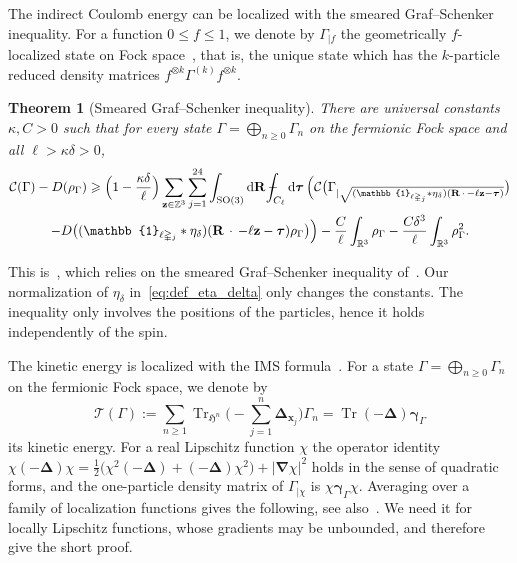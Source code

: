 \documentclass[final,reqno]{amsart}
\newtheorem{theorem}{Theorem}[section]
\theoremstyle{remark}
\renewcommand{\le}{\leqslant}
\renewcommand{\ge}{\geqslant}
\DeclareMathOperator{\Tr}{Tr}
\newcommand{\RR}{\mathbb{R}}
\newcommand{\ZZ}{\mathbb{Z}}
\newcommand{\SO}{\mathrm{SO}}
\newcommand{\iden}{\mathbb{1}}
\newcommand{\lapl}{\bm{\Delta}}
\newcommand{\grad}{\bm{\nabla}}
\newcommand{\tetra}{\mathbb{\Delta}}
\newcommand{\dd}{\mathrm{d}}
\newcommand{\TC}{\mathcal{T}}
\newcommand{\Cc}{\mathcal{C}}
\newcommand{\HF}{\mathfrak{H}}
\def\Xint#1{\mathchoice
{\XXint\displaystyle\textstyle{#1}}
{\XXint\textstyle\scriptstyle{#1}}
{\XXint\scriptstyle\scriptscriptstyle{#1}}
{\XXint\scriptscriptstyle\scriptscriptstyle{#1}}
\!\int}
\def\XXint#1#2#3{{\setbox0=\hbox{$#1{#2#3}{\int}$ }
\vcenter{\hbox{$#2#3$ }}\kern-.6\wd0}}
\def\dashint{\Xint-}
\begin{document}
The indirect Coulomb energy can be localized with the smeared Graf--Schenker inequality. For a function $0\le f\le1$, we denote by $\Gamma_{|f}$ the geometrically $f$-localized state on Fock space~\cite{lewin2011geometric}, that is, the unique state which has the $k$-particle reduced density matrices $f^{\otimes k}\Gamma^{(k)}f^{\otimes k}$.

\begin{theorem}[Smeared Graf--Schenker inequality]\label{thm:GS}
There are universal constants $\kappa,C>0$ such that for every state $\Gamma=\bigoplus_{n\ge0}\Gamma_n$ on the fermionic Fock space and all $\ell>\kappa\delta>0$,
\begin{multline*}
\Cc(\Gamma)-D(\rho_\Gamma)\ge\Big(1-\frac{\kappa\delta}{\ell}\Big)\sum_{\mathbf{z}\in\ZZ^3}\sum_{j=1}^{24}\int_{\SO(3)}\dd\mathbf{R}\,\dashint_{C_\ell}\dd\bm{\tau}\,\Big(\Cc\big(\Gamma_{|\sqrt{(\iden_{\ell\tetra_j}\ast\eta_\delta)(\mathbf{R}\,\cdot\,-\ell \mathbf{z}-\bm{\tau})}}\big)\\
-D\big((\iden_{\ell\tetra_j}\ast\eta_\delta)(\mathbf{R}\,\cdot\,-\ell \mathbf{z}-\bm{\tau})\rho_\Gamma\big)\Big)-\frac{C}{\ell}\int_{\RR^3}\rho_\Gamma-\frac{C\delta^3}{\ell}\int_{\RR^3}\rho_\Gamma^2.
\end{multline*}
\end{theorem}

This is~\cite[Eq.~(53)]{lewin2020local}, which relies on the smeared Graf--Schenker inequality of~\cite[Lemma~6]{graf1995molecular}. Our normalization of $\eta_\delta$ in~\cref{eq:def_eta_delta} only changes the constants. The inequality only involves the positions of the particles, hence it holds independently of the spin.

The kinetic energy is localized with the IMS formula~\cite{cycon2009schrodinger}. For a state $\Gamma=\bigoplus_{n\ge0}\Gamma_n$ on the fermionic Fock space, we denote by
$$
\TC(\Gamma):=\sum_{n\ge1}\Tr_{\HF^n}\Bigg(-\sum_{j=1}^n\lapl_{\mathbf{x}_j}\Bigg)\Gamma_n=\Tr(-\lapl)\bm{\gamma}_\Gamma
$$
its kinetic energy. For a real Lipschitz function $\chi$ the operator identity $\chi(-\lapl)\chi=\frac12\big(\chi^2(-\lapl)+(-\lapl)\chi^2\big)+|\grad\chi|^2$ holds in the sense of quadratic forms, and the one-particle density matrix of $\Gamma_{|\chi}$ is $\chi\bm{\gamma}_\Gamma\chi$. Averaging over a family of localization functions gives the following, see also~\cite[proof of Lemma~5.6]{lewin2018statistical}. We need it for locally Lipschitz functions, whose gradients may be unbounded, and therefore give the short proof.
\end{document}
